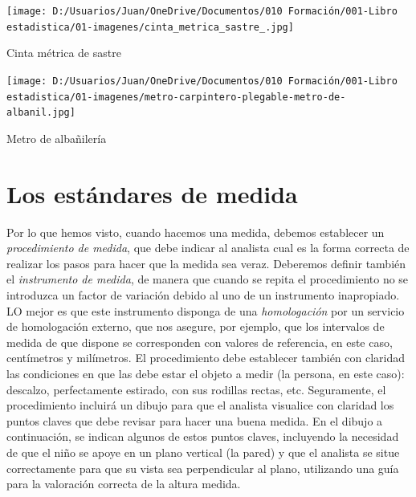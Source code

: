 \documentclass[
  letterpaper,
  DIV=11,
  numbers=noendperiod,
  oneside]{scrreprt}
\begin{document}
\begin{marginfigure}

{\centering \texttt{[image: D:/Usuarios/Juan/OneDrive/Documentos/010 Formación/001-Libro estadistica/01-imagenes/cinta\_metrica\_sastre\_.jpg]}

}

\caption{Cinta métrica de sastre}

\end{marginfigure}

\begin{marginfigure}

{\centering \texttt{[image: D:/Usuarios/Juan/OneDrive/Documentos/010 Formación/001-Libro estadistica/01-imagenes/metro-carpintero-plegable-metro-de-albanil.jpg]}

}

\caption{Metro de albañilería}

\end{marginfigure}

\hypertarget{los-estuxe1ndares-de-medida}{%
\section{Los estándares de medida}\label{los-estuxe1ndares-de-medida}}

Por lo que hemos visto, cuando hacemos una medida, debemos establecer un
\emph{procedimiento de medida}, que debe indicar al analista cual es la
forma correcta de realizar los pasos para hacer que la medida sea veraz.
Deberemos definir también el \emph{instrumento de medida}, de manera que
cuando se repita el procedimiento no se introduzca un factor de
variación debido al uno de un instrumento inapropiado. LO mejor es que
este instrumento disponga de una \emph{homologación} por un servicio de
homologación externo, que nos asegure, por ejemplo, que los intervalos
de medida de que dispone se corresponden con valores de referencia, en
este caso, centímetros y milímetros. El procedimiento debe establecer
también con claridad las condiciones en que las debe estar el objeto a
medir (la persona, en este caso): descalzo, perfectamente estirado, con
sus rodillas rectas, etc. Seguramente, el procedimiento incluirá un
dibujo para que el analista visualice con claridad los puntos claves que
debe revisar para hacer una buena medida. En el dibujo a continuación,
se indican algunos de estos puntos claves, incluyendo la necesidad de
que el niño se apoye en un plano vertical (la pared) y que el analista
se situe correctamente para que su vista sea perpendicular al plano,
utilizando una guía para la valoración correcta de la altura medida.
\end{document}
